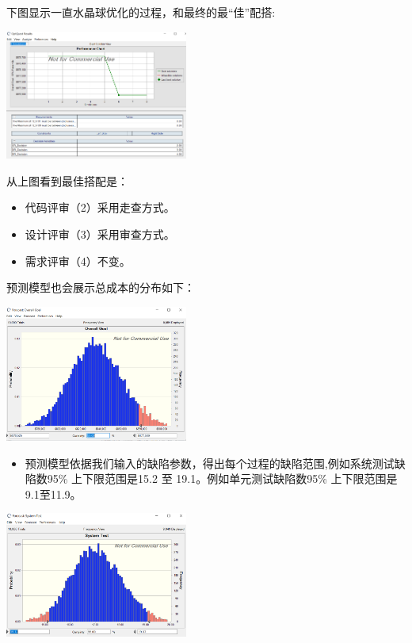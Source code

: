 下图显示一直水晶球优化的过程，和最终的最``佳''配搭:


\includegraphics[width=6cm]{YH.PNG}

从上图看到最佳搭配是：

\begin{itemize}
\tightlist
\item
  代码评审（2）采用走查方式。
\item
  设计评审（3）采用审查方式。
\item
  需求评审（4）不变。
\end{itemize}

预测模型也会展示总成本的分布如下：

\includegraphics[width=6cm]{YH-OG95.PNG}

\begin{itemize}
\tightlist
\item
  预测模型依据我们输入的缺陷参数，得出每个过程的缺陷范围,例如系统测试缺陷数95\%
  上下限范围是15.2 至 19.1。例如单元测试缺陷数95\% 上下限范围是9.1至11.9。
\end{itemize}

\includegraphics[width=6cm]{YH-ST.PNG}

